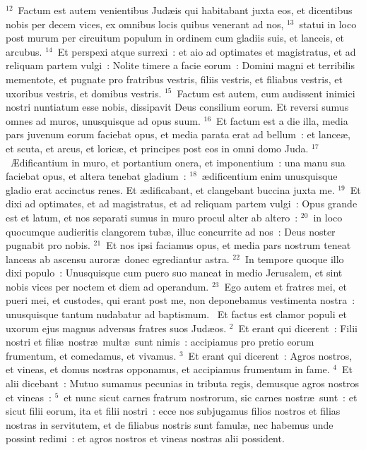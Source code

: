 ${}^{12}$~Factum est autem venientibus Jud\ae is qui habitabant juxta eos, et dicentibus nobis per decem vices, ex omnibus locis quibus venerant ad nos,
${}^{13}$~statui in loco post murum per circuitum populum in ordinem cum gladiis suis, et lanceis, et arcubus.
${}^{14}$~Et perspexi atque surrexi~: et aio ad optimates et magistratus, et ad reliquam partem vulgi~: Nolite timere a facie eorum~: Domini magni et terribilis mementote, et pugnate pro fratribus vestris, filiis vestris, et filiabus vestris, et uxoribus vestris, et domibus vestris.
${}^{15}$~Factum est autem, cum audissent inimici nostri nuntiatum esse nobis, dissipavit Deus consilium eorum. Et reversi sumus omnes ad muros, unusquisque ad opus suum.
${}^{16}$~Et factum est a die illa, media pars juvenum eorum faciebat opus, et media parata erat ad bellum~: et lance\ae , et scuta, et arcus, et loric\ae , et principes post eos in omni domo Juda.
${}^{17}$~\AE dificantium in muro, et portantium onera, et imponentium~: una manu sua faciebat opus, et altera tenebat gladium~:
${}^{18}$~\ae dificentium enim unusquisque gladio erat accinctus renes. Et \ae dificabant, et clangebant buccina juxta me.
${}^{19}$~Et dixi ad optimates, et ad magistratus, et ad reliquam partem vulgi~: Opus grande est et latum, et nos separati sumus in muro procul alter ab altero~:
${}^{20}$~in loco quocumque audieritis clangorem tub\ae , illuc concurrite ad nos~: Deus noster pugnabit pro nobis.
${}^{21}$~Et nos ipsi faciamus opus, et media pars nostrum teneat lanceas ab ascensu auror\ae\ donec egrediantur astra.
${}^{22}$~In tempore quoque illo dixi populo~: Unusquisque cum puero suo maneat in medio Jerusalem, et sint nobis vices per noctem et diem ad operandum.
${}^{23}$~Ego autem et fratres mei, et pueri mei, et custodes, qui erant post me, non deponebamus vestimenta nostra~: unusquisque tantum nudabatur ad baptismum.
~\lettrine[lines=10,image=true,loversize=0.05,lraise=-0.03]{E}{}t factus est clamor populi et uxorum ejus magnus adversus fratres suos Jud\ae os.
${}^{2}$~Et erant qui dicerent~: Filii nostri et fili\ae\ nostr\ae\ mult\ae\ sunt nimis~: accipiamus pro pretio eorum frumentum, et comedamus, et vivamus.
${}^{3}$~Et erant qui dicerent~: Agros nostros, et vineas, et domus nostras opponamus, et accipiamus frumentum in fame.
${}^{4}$~Et alii dicebant~: Mutuo sumamus pecunias in tributa regis, demusque agros nostros et vineas~:
${}^{5}$~et nunc sicut carnes fratrum nostrorum, sic carnes nostr\ae\ sunt~: et sicut filii eorum, ita et filii nostri~: ecce nos subjugamus filios nostros et filias nostras in servitutem, et de filiabus nostris sunt famul\ae , nec habemus unde possint redimi~: et agros nostros et vineas nostras alii possident.
